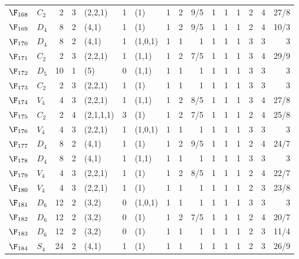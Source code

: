 \begin{landscape}
{\begin{longtable}{@{}l l r r l r l rrr rrr rrr@{}}
\addlinespace[3pt]
\textbf{$\F_{168}$} & $C_{2}$ & 2 & 3 & (2,2,1) & 1 & (1) & 1 & 2 & 9/5 & 1 & 1 & 1 & 2 & 4 & 27/8 \\
\addlinespace[3pt]
\textbf{$\F_{169}$} & $D_{4}$ & 8 & 2 & (4,1) & 1 & (1) & 1 & 2 & 9/5 & 1 & 1 & 1 & 2 & 4 & 10/3 \\
\addlinespace[3pt]
\textbf{$\F_{170}$} & $D_{4}$ & 8 & 2 & (4,1) & 1 & (1,0,1) & 1 & 1 & 1 & 1 & 1 & 1 & 3 & 3 & 3 \\
\addlinespace[3pt]
\textbf{$\F_{171}$} & $C_{2}$ & 2 & 3 & (2,2,1) & 1 & (1,1) & 1 & 2 & 7/5 & 1 & 1 & 1 & 3 & 4 & 29/9 \\
\addlinespace[3pt]
\textbf{$\F_{172}$} & $D_{5}$ & 10 & 1 & (5) & 0 & (1,1) & 1 & 1 & 1 & 1 & 1 & 1 & 3 & 3 & 3 \\
\addlinespace[3pt]
\textbf{$\F_{173}$} & $C_{2}$ & 2 & 3 & (2,2,1) & 1 & (1) & 1 & 1 & 1 & 1 & 1 & 1 & 3 & 3 & 3 \\
\addlinespace[3pt]
\textbf{$\F_{174}$} & $V_{4}$ & 4 & 3 & (2,2,1) & 1 & (1,1) & 1 & 2 & 8/5 & 1 & 1 & 1 & 3 & 4 & 27/8 \\
\addlinespace[3pt]
\textbf{$\F_{175}$} & $C_{2}$ & 2 & 4 & (2,1,1,1) & 3 & (1) & 1 & 2 & 7/5 & 1 & 1 & 1 & 2 & 4 & 25/8 \\
\addlinespace[3pt]
\textbf{$\F_{176}$} & $V_{4}$ & 4 & 3 & (2,2,1) & 1 & (1,0,1) & 1 & 1 & 1 & 1 & 1 & 1 & 3 & 3 & 3 \\
\addlinespace[3pt]
\textbf{$\F_{177}$} & $D_{4}$ & 8 & 2 & (4,1) & 1 & (1) & 1 & 2 & 9/5 & 1 & 1 & 1 & 2 & 4 & 24/7 \\
\addlinespace[3pt]
\textbf{$\F_{178}$} & $D_{4}$ & 8 & 2 & (4,1) & 1 & (1,1) & 1 & 1 & 1 & 1 & 1 & 1 & 3 & 3 & 3 \\
\addlinespace[3pt]
\textbf{$\F_{179}$} & $V_{4}$ & 4 & 3 & (2,2,1) & 1 & (1) & 1 & 2 & 8/5 & 1 & 1 & 1 & 2 & 4 & 22/7 \\
\addlinespace[3pt]
\textbf{$\F_{180}$} & $V_{4}$ & 4 & 3 & (2,2,1) & 1 & (1) & 1 & 1 & 1 & 1 & 1 & 1 & 2 & 3 & 23/8 \\
\addlinespace[3pt]
\textbf{$\F_{181}$} & $D_{6}$ & 12 & 2 & (3,2) & 0 & (1,0,1) & 1 & 1 & 1 & 1 & 1 & 1 & 3 & 3 & 3 \\
\addlinespace[3pt]
\textbf{$\F_{182}$} & $D_{6}$ & 12 & 2 & (3,2) & 0 & (1) & 1 & 2 & 7/5 & 1 & 1 & 1 & 2 & 4 & 20/7 \\
\addlinespace[3pt]
\textbf{$\F_{183}$} & $D_{6}$ & 12 & 2 & (3,2) & 0 & (1) & 1 & 1 & 1 & 1 & 1 & 1 & 2 & 3 & 11/4 \\
\addlinespace[3pt]
\textbf{$\F_{184}$} & $S_{4}$ & 24 & 2 & (4,1) & 1 & (1) & 1 & 1 & 1 & 1 & 1 & 1 & 2 & 3 & 26/9 \\

\end{longtable}}
\end{landscape}
